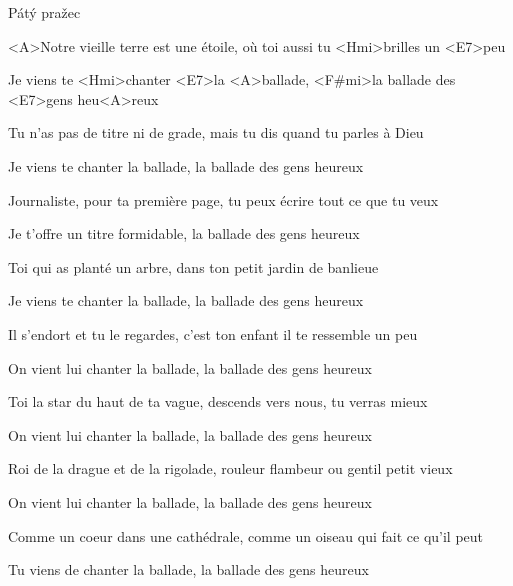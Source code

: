 

Pátý pražec

\zs
<A>Notre vieille terre est une étoile, où toi aussi tu <Hmi>brilles un <E7>peu

Je viens te <Hmi>chanter <E7>la <A>ballade, <F#mi>la ballade des <E7>gens heu<A>reux 
\ks

\zs
Tu n'as pas de titre ni de grade, mais tu dis  quand tu parles à Dieu

Je viens te chanter la ballade, la ballade des gens heureux
\ks

\zs
Journaliste, pour ta première page, tu peux écrire tout ce que tu veux

Je t'offre un titre formidable, la ballade des gens heureux 
\ks

\zs
Toi qui as planté un arbre, dans ton petit jardin de banlieue

Je viens te chanter la ballade, la ballade des gens heureux
\ks

\zs
Il s'endort et tu le regardes, c'est ton enfant il te ressemble un peu

On vient lui chanter la ballade, la ballade des gens heureux 
\ks

\zs
Toi la star du haut de ta vague, descends vers nous, tu verras mieux

On vient lui chanter la ballade, la ballade des gens heureux 
\ks

\zs
Roi de la drague et de la rigolade, rouleur flambeur ou gentil petit vieux

On vient lui chanter la ballade, la ballade des gens heureux 
\ks

\zs
Comme un coeur dans une cathédrale, comme un oiseau qui fait ce qu'il peut

Tu viens de chanter la ballade, la ballade des gens heureux
\ks

\kp

